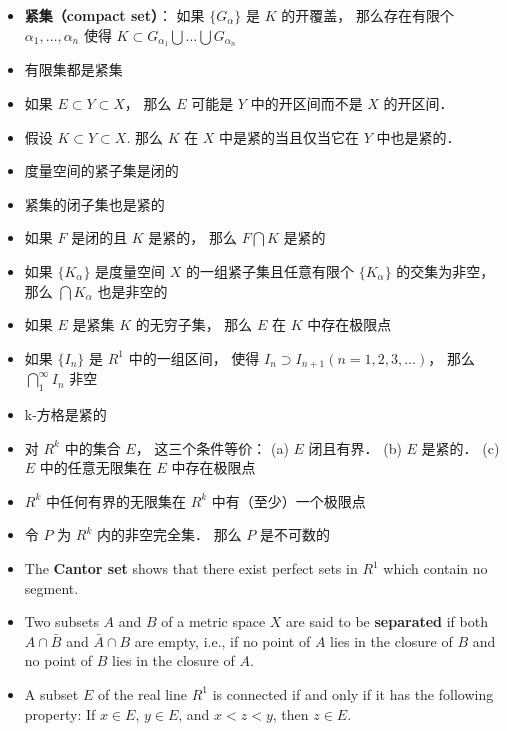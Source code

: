 \begin{itemize}
\item \textbf{紧集（compact set）}： 如果 $\{G_\alpha\}$ 是 $K$ 的开覆盖， 那么存在有限个 $\alpha_1,\dots, \alpha_n$ 使得 $K \subset G_{\alpha_1} \bigcup \dots \bigcup G_{\alpha_n}$

\item 有限集都是紧集

\item 如果 $E \subset Y \subset X$， 那么 $E$ 可能是 $Y$ 中的开区间而不是 $X$ 的开区间．

\item 假设 $K \subset Y \subset X$. 那么 $K$ 在 $X$ 中是紧的当且仅当它在 $Y$ 中也是紧的．

\item 度量空间的紧子集是闭的

\item 紧集的闭子集也是紧的

\item 如果 $F$ 是闭的且 $K$ 是紧的， 那么 $F \bigcap K$ 是紧的

\item 如果 $\{K_\alpha\}$ 是度量空间 $X$ 的一组紧子集且任意有限个 $\{K_\alpha\}$ 的交集为非空， 那么 $\bigcap K_\alpha$ 也是非空的
\item 如果 $E$ 是紧集 $K$ 的无穷子集， 那么 $E$ 在 $K$ 中存在极限点

\item 如果 $\{I_n\}$ 是 $R^1$ 中的一组区间， 使得 $I_n \supset I_{n+1} (n = 1, 2, 3,\dots)$， 那么 $\bigcap_1^\infty I_n$ 非空

\item k-方格是紧的

\item 对 $R^k$ 中的集合 $E$， 这三个条件等价： (a) $E$ 闭且有界． (b) $E$ 是紧的． (c) $E$ 中的任意无限集在 $E$ 中存在极限点

\item $R^k$ 中任何有界的无限集在 $R^k$ 中有（至少）一个极限点

\item 令 $P$ 为 $R^k$ 内的非空完全集． 那么 $P$ 是不可数的

\item The \textbf{Cantor set} shows that there exist perfect sets in $R^1$ which contain no segment.

\item Two subsets $A$ and $B$ of a metric space $X$ are said to be \textbf{separated} if both $A \cap \bar B$ and $\bar A \cap B$ are empty, i.e., if no point of $A$ lies in the closure of $B$ and no point of $B$ lies in the closure of $A$.

\item A subset $E$ of the real line $R^1$ is connected if and only if it has the following property:  If $x \in E$, $y \in E$, and $x < z < y$, then $z \in E$.
\end{itemize}

